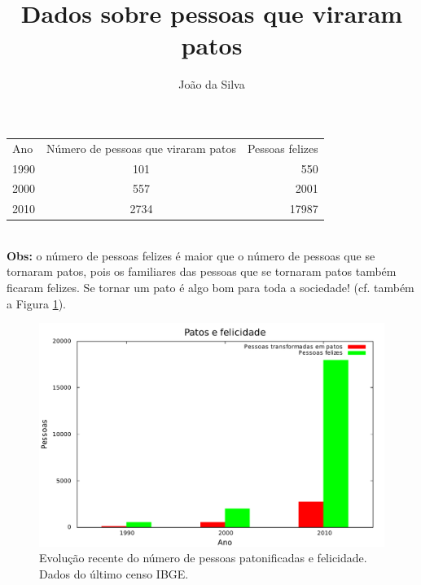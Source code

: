 \documentclass[11pt, a4paper]{article}
\title{Dados sobre pessoas que viraram patos}
\author{João da Silva}
\begin{document}
  \maketitle

  \begin{tabular}{l c r}
    Ano & Número de pessoas que viraram patos & Pessoas felizes\\
    1990 & 101 & 550\\
    2000 & 557 & 2001\\
    2010 & 2734 & 17987\\
  \end{tabular}
  \\[1cm]
  \textbf{Obs:} o número de pessoas felizes é maior que o número de pessoas que se tornaram patos, pois os familiares das pessoas que se tornaram patos também ficaram felizes. Se tornar um pato é algo bom para toda a sociedade! (cf. também a Figura \ref{fig:graf_pato}).
  
  \begin{figure}[htb]
  \centering
  \includegraphics[width=\textwidth]{grafico_patos.pdf}
  \caption{Evolução recente do número de pessoas patonificadas e felicidade. Dados do último censo IBGE.}
  \label{fig:graf_pato}
  \end{figure}
\end{document}

